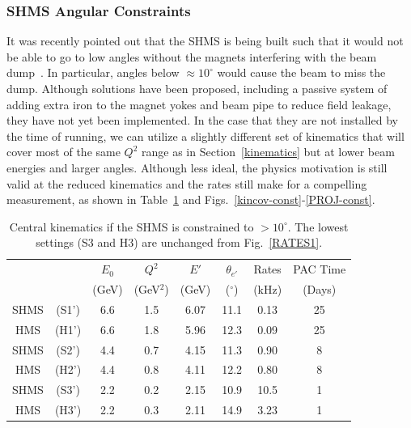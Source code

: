 \iffalse
\subsubsection{SHMS Angular Constraints}

It was recently pointed out that the SHMS is being built such that it would not be able to go to low angles without the magnets interfering with the beam dump~\cite{Moore:2014sxa}. In particular, angles below $\approx10^{\circ}$ would cause the beam to miss the dump. Although solutions have been proposed, including a passive system of adding extra iron to the magnet yokes and beam pipe to reduce field leakage, they have not yet been implemented. In the case that they are not installed by the time of running, we can utilize a slightly different set of kinematics that will cover most of the same $Q^2$ range as in Section~\ref{kinematics} but at lower beam energies and larger angles. Although less ideal, the physics motivation is still valid at the reduced kinematics and the rates still make for a compelling measurement, as shown in Table~\ref{RATES1-const} and Figs.~\ref{kincov-const}-\ref{PROJ-const}.

\begin{table}
\begin{center}
\begin{tabular}{cc|c|c|c|c|c|c}
 & & $E_0$ & $Q^2$    	& $E'$  &    $\theta_{e'}$  &  Rates   & PAC Time   \\
& & (GeV) & (GeV$^2$)  & (GeV)  &     ($^{\circ}$)   &   (kHz)  & (Days) \\
\hline\hline
SHMS & (S1') & 6.6	&  1.5	&  6.07	&    11.1  	&    0.13	&   25 \\
HMS  & (H1') & 6.6	&  1.8	&  5.96	&    12.3	&    0.09	&   25 \\  
SHMS & (S2') & 4.4	&  0.7	&  4.15	&    11.3 	&    0.90	&   8 \\
HMS  & (H2') & 4.4	&  0.8	&  4.11	&    12.2	&    0.80	&   8 \\
SHMS & (S3') & 2.2	&  0.2	&  2.15	&    10.9 	&    10.5	&   1 \\
HMS  & (H3') & 2.2	&  0.3	&  2.11	&    14.9	&    3.23	&   1 \\  
\hline\hline
\end{tabular}
\caption{\label{RATES1-const}Central kinematics if the SHMS is constrained to $>10^{\circ}$. The lowest settings (S3 and H3) are unchanged from Fig.~\ref{RATES1}.}
\end{center}
\end{table}

